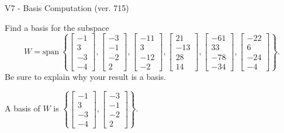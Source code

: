 \begin{exercise}
  \begin{exerciseTitle}V7 - Basis Computation (ver. 715)\end{exerciseTitle}
  \begin{exerciseStatement}
    Find a basis for the subspace 
\[W=\mathrm{span}\ \left\{\left[\begin{array}{r}
-1 \\
3 \\
-3 \\
-4
\end{array}\right] , \left[\begin{array}{r}
-3 \\
-1 \\
-2 \\
2
\end{array}\right] , \left[\begin{array}{r}
-11 \\
3 \\
-12 \\
-2
\end{array}\right] , \left[\begin{array}{r}
21 \\
-13 \\
28 \\
14
\end{array}\right] , \left[\begin{array}{r}
-61 \\
33 \\
-78 \\
-34
\end{array}\right] , \left[\begin{array}{r}
-22 \\
6 \\
-24 \\
-4
\end{array}\right]\right\}.\]
 Be sure to explain why your result is a basis.


  \end{exerciseStatement}
  \begin{exerciseAnswer}
   A basis of \(W\) is  \(\left\{\left[\begin{array}{r}
-1 \\
3 \\
-3 \\
-4
\end{array}\right] , \left[\begin{array}{r}
-3 \\
-1 \\
-2 \\
2
\end{array}\right]\right\}\).
  


  \end{exerciseAnswer}
\end{exercise}